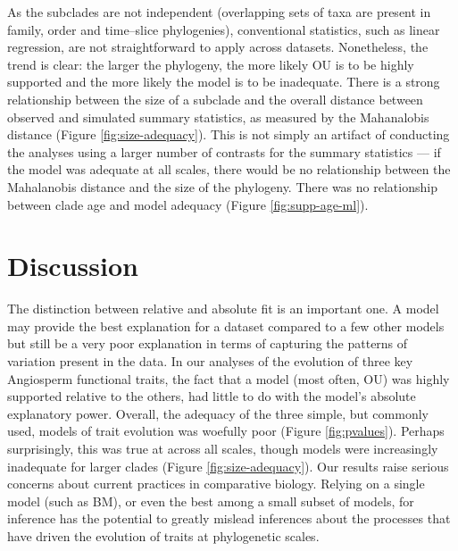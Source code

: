 \documentclass[a4paper,12pt]{article}
\begin{document}
As the subclades are not independent (overlapping sets of taxa are present in family, order and time--slice phylogenies), conventional statistics, such as linear regression, are not straightforward to apply across datasets. Nonetheless, the trend is clear: the larger the phylogeny, the more likely OU is to be highly supported and the more likely the model is to be inadequate. There is a strong relationship between the size of a subclade and the overall distance between observed and simulated summary statistics, as measured by the Mahanalobis distance (Figure \ref{fig:size-adequacy}). This is not simply an artifact of conducting the analyses using a larger number of contrasts for the summary statistics --- if the model was adequate at all scales, there would be no relationship between the Mahalanobis distance and the size of the phylogeny. There was no relationship between clade age and model adequacy (Figure \ref{fig:supp-age-ml}).


\section{Discussion}

The distinction between relative and absolute fit is an important one. A model may provide the best explanation for a dataset compared to a few other models but still be a very poor explanation in terms of capturing the patterns of variation present in the data. 
In our analyses of the evolution of three key Angiosperm functional traits, the fact that a model (most often, OU) was highly supported relative to the others, had little to do with the model's absolute explanatory power. Overall, the adequacy of the three simple, but commonly used, models of trait evolution was woefully poor (Figure \ref{fig:pvalues}). Perhaps surprisingly, this was true at across all scales, though models were increasingly inadequate for larger clades (Figure \ref{fig:size-adequacy}). Our results raise serious concerns about current practices in comparative biology. Relying on a single model (such as BM), or even the best among a small subset of models, for inference has the potential to greatly mislead inferences about the processes that have driven the evolution of traits at phylogenetic scales.
\end{document}
